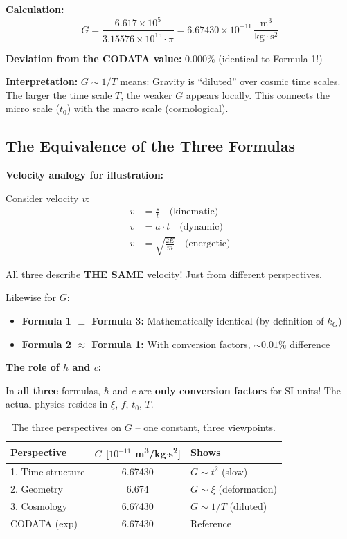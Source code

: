 	\textbf{Calculation:}
	\begin{equation}
		G = \frac{6.617 \times 10^5}{3.15576 \times 10^{15} \cdot \pi} = 6.67430 \times 10^{-11}\,\frac{\text{m}^3}{\text{kg} \cdot \text{s}^2}
	\end{equation}
	
	\textbf{Deviation from the CODATA value:} \(0.000\%\) (identical to Formula 1!)
	
	\textbf{Interpretation:} \(G \sim 1/T\) means: Gravity is \enquote{diluted} over cosmic time scales. The larger the time scale \(T\), the weaker \(G\) appears locally. This connects the micro scale (\(t_0\)) with the macro scale (cosmological).
	
	\subsection{The Equivalence of the Three Formulas}
	
	\textbf{Velocity analogy for illustration:}
	
	Consider velocity \(v\):
	\begin{align}
		v &= \frac{s}{t} \quad \text{(kinematic)} \\
		v &= a \cdot t \quad \text{(dynamic)} \\
		v &= \sqrt{\frac{2E}{m}} \quad \text{(energetic)}
	\end{align}
	
	All three describe \textbf{THE SAME} velocity! Just from different perspectives.
	
	Likewise for \(G\):
	\begin{itemize}
		\item \textbf{Formula 1 \(\equiv\) Formula 3:} Mathematically identical (by definition of \(k_G\))
		\item \textbf{Formula 2 \(\approx\) Formula 1:} With conversion factors, \(\sim0.01\%\) difference
	\end{itemize}
	
	\textbf{The role of \(\hbar\) and \(c\):}
	
	In \textbf{all three} formulas, \(\hbar\) and \(c\) are \textbf{only conversion factors} for SI units! The actual physics resides in \(\xi\), \(f\), \(t_0\), \(T\).
	
	\begin{table}[h!]
		\centering
		\begin{tabular}{lcl}
			\hline
			\textbf{Perspective} & \(G\) [\(10^{-11}\) m\textsuperscript{3}/kg$\cdot$s\textsuperscript{2}] & \textbf{Shows} \\ \hline
			1. Time structure & 6.67430 & \(G \sim t^2\) (slow) \\ \hline
			2. Geometry & 6.674 & \(G \sim \xi\) (deformation) \\ \hline
			3. Cosmology & 6.67430 & \(G \sim 1/T\) (diluted) \\ \hline
			CODATA (exp) & 6.67430 & Reference \\ \hline
		\end{tabular}
		\caption{The three perspectives on \(G\) -- one constant, three viewpoints.}
	\end{table}
	
